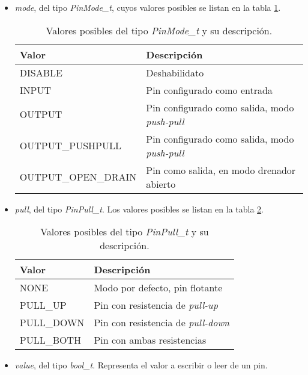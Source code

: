 \begin{itemize}
\item
\emph{mode}, del tipo \emph{PinMode\_t}, cuyos valores posibles se listan en la tabla \ref{tab:PinModeT}.


\begin{table}[h]
	\centering	
	\begin{tabular}{l l}   
		\toprule
		\textbf{Valor} 	    & \textbf{Descripción}  \\
		\midrule
		DISABLE	 & Deshabilidato \\		
		INPUT	    & Pin configurado como entrada	\\
		OUTPUT	 & Pin configurado como salida, modo \emph{push-pull}	\\
		OUTPUT\_PUSHPULL & Pin configurado como salida, modo \emph{push-pull}	\\
		OUTPUT\_OPEN\_DRAIN	 & Pin como salida, en modo drenador abierto	\\
		\bottomrule
		\hline
	\end{tabular}
	\caption[Valores posibles del tipo \emph{PinMode\_t}.]{Valores posibles del tipo \emph{PinMode\_t} y su descripción.}
	\label{tab:PinModeT}
\end{table}

\item
\emph{pull}, del tipo \emph{PinPull\_t}. Los valores posibles se listan en la tabla \ref{tab:PullT}.


\begin{table}[h]
	\centering	
	\begin{tabular}{l l}   
		\toprule
		\textbf{Valor} 	    & \textbf{Descripción} \\
		\midrule
		NONE	       & Modo por defecto, pin flotante \\		
		PULL\_UP	    & Pin con resistencia de \emph{pull-up} \\
		PULL\_DOWN	 & Pin con resistencia de \emph{pull-down} \\
		PULL\_BOTH	 & Pin con ambas resistencias \\
		\bottomrule
		\hline
	\end{tabular}
	\caption[Valores posibles del tipo \emph{PinPull\_t}.]{Valores posibles del tipo \emph{PinPull\_t} y su descripción.}
	\label{tab:PullT}
\end{table}

\item
\emph{value}, del tipo \emph{bool\_t}. Representa el valor a escribir o leer de un pin.
\end{itemize}

